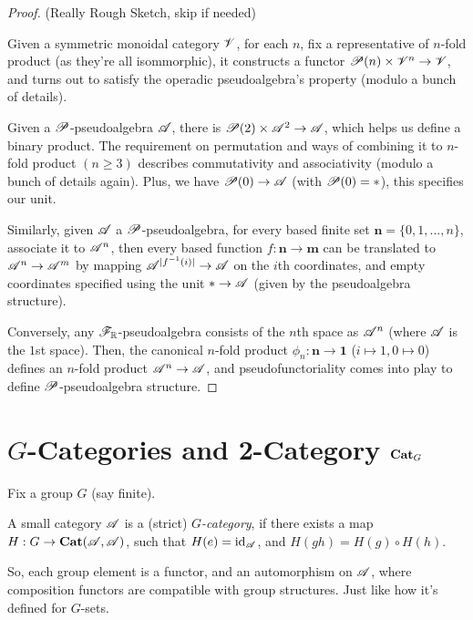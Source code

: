 \documentclass{article}
\begin{document}
\begin{proof}(Really Rough Sketch, skip if needed)
    
    Given a symmetric monoidal category $\mathscr{V}$, for each $n$, fix a representative of $n$-fold product (as they're all isommorphic), it constructs a functor $\mathscr{P}(n)\times\mathscr{V}^n\rightarrow\mathscr{V}$, and turns out to satisfy the operadic pseudoalgebra's property (modulo a bunch of details).

    Given a $\mathscr{P}$-pseudoalgebra $\mathscr{A}$, there is $\mathscr{P}(2)\times \mathscr{A}^2\rightarrow\mathscr{A}$, which helps us define a binary product. The requirement on permutation and ways of combining it to $n$-fold product $(n\geq 3)$ describes commutativity and associativity (modulo a bunch of details again). Plus, we have $\mathscr{P}(0)\rightarrow \mathscr{A}$ (with $\mathscr{P}(0)=*$), this specifies our unit.

    \hfil

    Similarly, given $\mathscr{A}$ a $\mathscr{P}$-pseudoalgebra, for every based finite set $\mathbf{n}=\{0,1,...,n\}$, associate it to $\mathscr{A}^n$, then every based function $f:\mathbf{n}\rightarrow\mathbf{m}$ can be translated to $\mathscr{A}^n\rightarrow\mathscr{A}^m$ by mapping $\mathscr{A}^{|f^{-1}(i)|}\rightarrow\mathscr{A}$ on the $i$th coordinates, and empty coordinates specified using the unit $*\rightarrow \mathscr{A}$ (given by the pseudoalgebra structure).

    Conversely, any $\mathscr{F}_{\mathbb{R}}$-pseudoalgebra consists of the $n$th space as $\mathscr{A}^n$ (where $\mathscr{A}$ is the $1$st space). Then, the canonical $n$-fold product $\phi_n:\mathbf{n}\rightarrow\mathbf{1}$ ($i\mapsto 1,0\mapsto 0$) defines an $n$-fold product $\mathscr{A}^n\rightarrow\mathscr{A}$, and pseudofunctoriality comes into play to define $\mathscr{P}$-pseudoalgebra structure.
\end{proof}

\hfil

\section{$G$-Categories and 2-Category $\mathbf{Cat}_G$}

Fix a group $G$ (say finite).

\begin{defn}
A small category $\mathscr{A}$ is a (strict) \emph{$G$-category}, if there exists a map $H:G\rightarrow \mathbf{Cat}(\mathscr{A},\mathscr{A})$, such that $H(e)=\mathrm{id}_{\mathscr{A}}$, and $H(gh)=H(g)\circ H(h)$.
\end{defn}

So, each group element is a functor, and an automorphism on $\mathscr{A}$, where composition functors are compatible with group structures. Just like how it's defined for $G$-sets.
\end{document}
